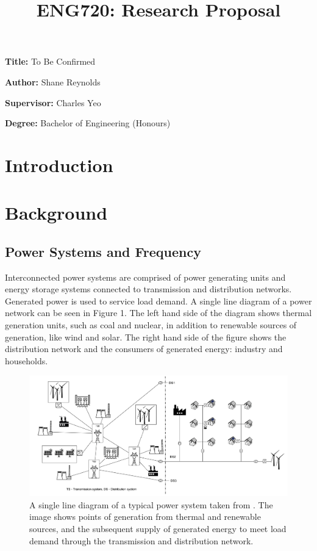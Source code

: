 \documentclass[12pt, a4paper]{article}
\title{ENG720: Research Proposal}
\author{}
\date{}
\newcommand{\namelistlabel}[1]{\mbox{#1}\hfil}
\newenvironment{namelist}[1]{%
\begin{list}{}
    {
        \let\makelabel\namelistlabel
        \settowidth{\labelwidth}{#1}
        \setlength{\leftmargin}{1.1\labelwidth}
    }
  }{%
\end{list}}
\begin{document}
\maketitle

\begin{namelist}{xxxxxxxxxxxx}
\item[{\bf Title:}]
	To Be Confirmed
\item[{\bf Author:}]
	Shane Reynolds
\item[{\bf Supervisor:}]
	Charles Yeo
\item[{\bf Degree:}]
	Bachelor of Engineering (Honours)
\end{namelist}


\tableofcontents
\newpage

\section{Introduction}

\section{Background}

\subsection{Power Systems and Frequency}
Interconnected power systems are comprised of power generating units and energy storage systems connected to transmission and distribution networks. Generated power is used to service load demand. A single line diagram of a power network can be seen in Figure 1. The left hand side of the diagram shows thermal generation units, such as coal and nuclear, in addition to renewable sources of generation, like wind and solar. The right hand side of the figure shows the distribution network and the consumers of generated energy: industry and households.
\begin{figure}[h]
	\centering
	\includegraphics[scale=0.85]{power_system}
	\caption{A single line diagram of a typical power system taken from \cite{Glavic2019}. The image shows points of generation from thermal and renewable sources, and the subsequent supply of generated energy to meet load demand through the transmission and distribution network.}
\end{figure}
\end{document}
